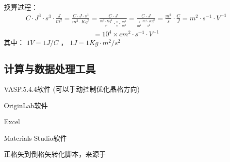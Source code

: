 \documentclass[a4paper,12pt,english]{sphinxmanual}
\begin{document}
\sphinxAtStartPar
换算过程：
\begin{equation*}
\begin{split}C \cdot J^3 \cdot s^3 \cdot \frac{J}{m^2} = \frac{C \cdot J \cdot s^3}{m^2 \cdot Kg^2}
= \frac{C \cdot J}{\frac{m^2 \cdot Kg^2}{s^3} \cdot \frac{s}{s} \cdot \frac{m^2}{m^2}}
= \frac{C \cdot J}{\frac{s}{m^2} \frac{m^4 \cdot Kg^2}{s^4}}
= \frac{m^2}{s} \cdot \frac{C}{J} = m^2 \cdot s^{-1} \cdot V^{-1}\end{split}
\end{equation*}\begin{equation*}
\begin{split}= 10^4 \times cm^2 \cdot s^{-1} \cdot V^{-1}\end{split}
\end{equation*}
\sphinxAtStartPar
其中： \(1 V = 1 J/C\) ， \(1 J = 1Kg \cdot m^2 / s^2\)


\subsection{计算与数据处理工具}
\label{\detokenize{tutorials/vasp/mobility:id3}}
\begin{DUlineblock}{0em}
\item[] VASP.5.4.4软件 (可以手动控制优化晶格方向)
\item[] OriginLab软件
\item[] Excel
\item[] Materials Studio软件
\item[] 正格矢到倒格矢转化脚本，来源于 %
\begin{footnote}[16]\sphinxAtStartFootnote
{}
%
\end{footnote}
\end{DUlineblock}
\end{document}
